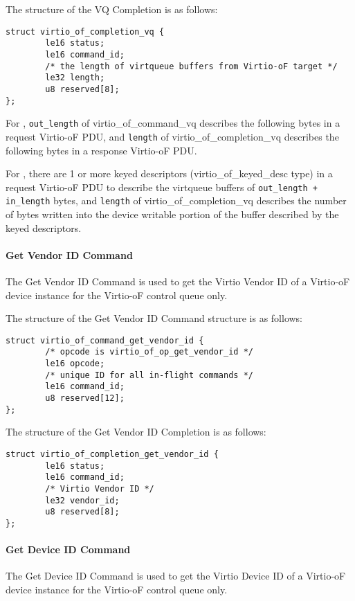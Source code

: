 The structure of the VQ Completion is as follows:
\begin{lstlisting}
struct virtio_of_completion_vq {
        le16 status;
        le16 command_id;
        /* the length of virtqueue buffers from Virtio-oF target */
        le32 length;
        u8 reserved[8];
};
\end{lstlisting}

For ,
\texttt{out_length} of virtio_of_command_vq describes the following bytes in a request Virtio-oF PDU,
and \texttt{length} of virtio_of_completion_vq describes the following bytes in a response Virtio-oF PDU.

For ,
there are 1 or more keyed descriptors (virtio_of_keyed_desc type) in a request Virtio-oF PDU to describe the virtqueue buffers of \texttt{out_length + in_length} bytes,
and \texttt{length} of virtio_of_completion_vq describes the number of bytes written into the device writable portion of the buffer described by the keyed descriptors.

\paragraph{Get Vendor ID Command}\label{sec:Virtio Transport Options / Virtio Over Fabrics / Commands Definition / Opcodes / Get Vendor ID Command}
The Get Vendor ID Command is used to get the Virtio Vendor ID of a Virtio-oF device instance for the Virtio-oF control queue only.

The structure of the Get Vendor ID Command structure is as follows:
\begin{lstlisting}
struct virtio_of_command_get_vendor_id {
        /* opcode is virtio_of_op_get_vendor_id */
        le16 opcode;
        /* unique ID for all in-flight commands */
        le16 command_id;
        u8 reserved[12];
};
\end{lstlisting}

The structure of the Get Vendor ID Completion is as follows:
\begin{lstlisting}
struct virtio_of_completion_get_vendor_id {
        le16 status;
        le16 command_id;
        /* Virtio Vendor ID */
        le32 vendor_id;
        u8 reserved[8];
};
\end{lstlisting}

\paragraph{Get Device ID Command}\label{sec:Virtio Transport Options / Virtio Over Fabrics / Commands Definition / Opcodes / Get Device ID Command}
The Get Device ID Command is used to get the Virtio Device ID of a Virtio-oF device instance for the Virtio-oF control queue only.

